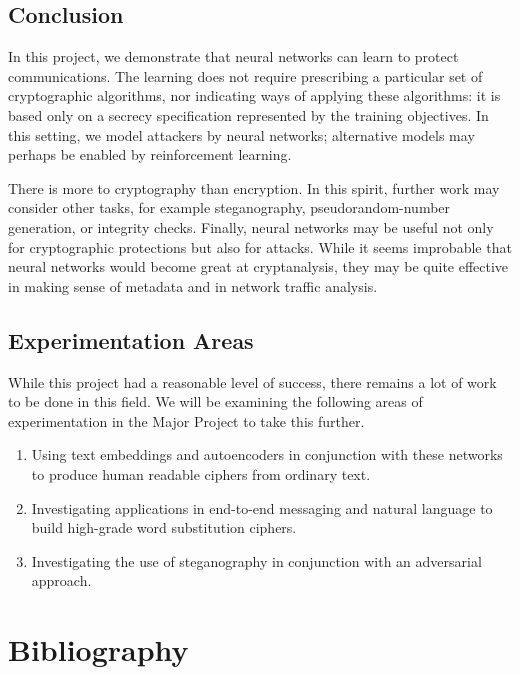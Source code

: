 \documentclass[a4paper]{article}
\begin{document}
    \pagebreak
    \subsection{Conclusion}
    In this project, we demonstrate that neural networks can learn to protect communications. The learning
    does not require prescribing a particular set of cryptographic algorithms, nor indicating ways
    of applying these algorithms: it is based only on a secrecy specification represented by the training
    objectives. In this setting, we model attackers by neural networks; alternative models may perhaps
    be enabled by reinforcement learning.

    There is more to cryptography than encryption. In this spirit, further work may consider other tasks,
    for example steganography, pseudorandom-number generation, or integrity checks. Finally, neural
    networks may be useful not only for cryptographic protections but also for attacks. While it seems
    improbable that neural networks would become great at cryptanalysis, they may be quite effective
    in making sense of metadata and in network traffic analysis.

    \subsection{Experimentation Areas}
    While this project had a reasonable level of success, there remains a lot of work to be done
    in this field. We will be examining the following areas of experimentation in the Major Project
    to take this further.
    \begin{enumerate}
      \item Using text embeddings and autoencoders in conjunction with these networks to produce 
      human readable ciphers from ordinary text.
      \item Investigating applications in end-to-end messaging and natural language to build 
      high-grade word substitution ciphers.
      \item Investigating the use of steganography in conjunction with an adversarial approach.
    \end{enumerate}

  \newpage
  \section*{Bibliography}
  
  
  \listoffigures
\end{document}

